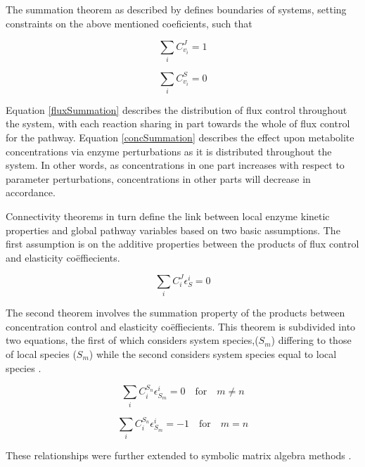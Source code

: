 The summation theorem as described by \citeauthor{Kacser1979,Rapoport1974} defines boundaries of systems, setting constraints on the above mentioned coeficients, such that 

\begin{equation}\label{fluxSummation}
\sum_{i}C_{v_i}^J=1
\end{equation}

\begin{equation}\label{concSummation}
\sum_{i}C_{v_i}^S=0
\end{equation}

Equation \ref{fluxSummation} describes the distribution of flux control throughout the system, with each reaction sharing in part towards the whole of flux control for the pathway. Equation \ref{concSummation} describes the effect upon metabolite concentrations via enzyme perturbations as it is distributed throughout the system. In other words, as concentrations in one part increases with respect to parameter perturbations, concentrations in other parts will decrease in accordance.

Connectivity theorems in turn define the link between local enzyme kinetic properties and global pathway variables based on two basic assumptions. The first assumption is on the additive properties between the products of flux control and elasticity co\"effiecients.

\begin{equation}
\sum_{i}C_{i}^J\epsilon_S^i=0
\end{equation}

The second theorem involves the summation property of the products between concentration control and elasticity co\"effiecients. This theorem is subdivided into two equations, the first of which considers system species,($S_m$) differing to those of local species ($S_m$) while the second considers system species equal to local species \citep{Kacser1979, Westerhoff1984}.

\begin{equation}
\sum_{i}C_{i}^{S_n}\epsilon_{S_m}^i=0\quad \textrm{for}\quad m\ne n
\end{equation}

\begin{equation}
\sum_{i}C_{i}^{S_n}\epsilon_{S_m}^i=-1\quad \textrm{for}\quad m = n
\end{equation}

These relationships were further extended to symbolic matrix algebra methods \cite{Fell1992,Kacser1995,Ehlde1997,Hofmeyr2001}.


